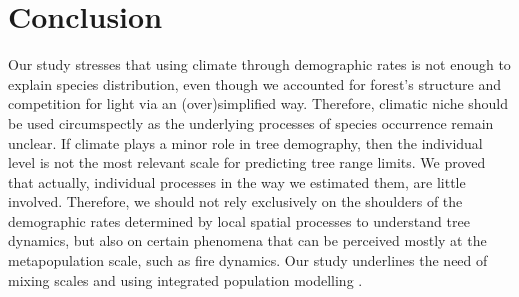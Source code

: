 
\section{Conclusion}
Our study stresses that using climate through demographic rates is not enough to explain species distribution, even though we accounted for forest's structure and competition for light via an (over)simplified way. Therefore, climatic niche should be used circumspectly as the underlying processes of species occurrence remain unclear. If climate plays a minor role in tree demography, then the individual level is not the most relevant scale for predicting tree range limits. We proved that actually, individual processes in the way we estimated them, are little involved. Therefore, we should not rely exclusively on the shoulders of the demographic rates determined by local spatial processes to understand tree dynamics, but also on certain phenomena that can be perceived mostly at the metapopulation scale, such as fire dynamics. Our study underlines the need of mixing scales and using integrated population modelling \citep{Isaac2020}.
